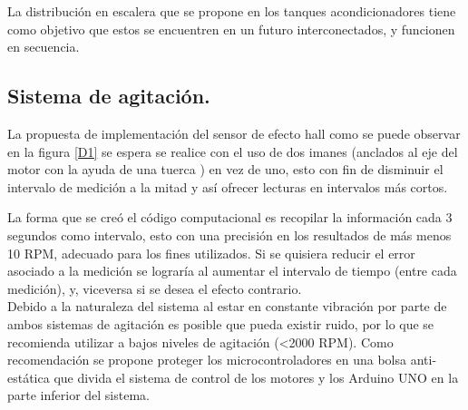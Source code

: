 \documentclass[11pt,letter
								]
								{article}
\begin{document}
La distribución en escalera que se propone en los tanques acondicionadores tiene como objetivo que estos se encuentren en un futuro  interconectados, y funcionen en secuencia. \\



\subsection {Sistema de agitación. }
	
	La propuesta de implementación  del sensor de efecto hall como se puede observar en la figura \ref{D1} se espera se realice con el uso de dos imanes (anclados al eje del motor con la ayuda de una tuerca )  en vez de uno, esto con fin de disminuir el intervalo de medición a la mitad y así ofrecer lecturas en intervalos más cortos. %
	
	La forma que se creó el código computacional es recopilar la información cada 3 segundos como intervalo, esto con una precisión en los resultados de más menos 10 RPM, adecuado para los fines utilizados. Si se quisiera reducir el error asociado a la medición se lograría al aumentar el intervalo de tiempo (entre cada medición), y, viceversa si se desea el efecto contrario. \\


Debido a la naturaleza del sistema al estar en constante vibración por parte de ambos sistemas de agitación es posible que pueda existir ruido, por lo que se recomienda utilizar a bajos niveles de agitación (<2000 RPM). Como recomendación se propone proteger los microcontroladores en una bolsa anti-estática que divida el sistema de control de los motores  y los Arduino UNO en la parte inferior del sistema.\\
\end{document}
